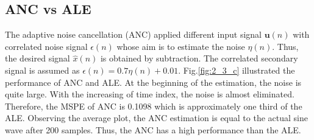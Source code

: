 \subsection{ANC vs ALE}
The adaptive noise cancellation (ANC) applied different input signal $\mathbf u(n)$ with correlated noise signal $\epsilon(n)$ whose aim is to estimate the noise $\eta(n)$. Thus, the desired signal $\hat x(n)$ is obtained by subtraction. The correlated secondary signal is assumed as $\epsilon(n) = 0.7\eta(n) + 0.01$. Fig.\ref{fig:2_3_c} illustrated the performance of ANC and ALE. At the beginning of the estimation, the noise is quite large. With the increasing of time index, the noise is almost eliminated. Therefore, the MSPE of ANC is 0.1098 which is approximately one third of the ALE. Observing the average plot, the ANC estimation is equal to the actual sine wave after 200 samples. Thus, the ANC has a high performance than the ALE.
